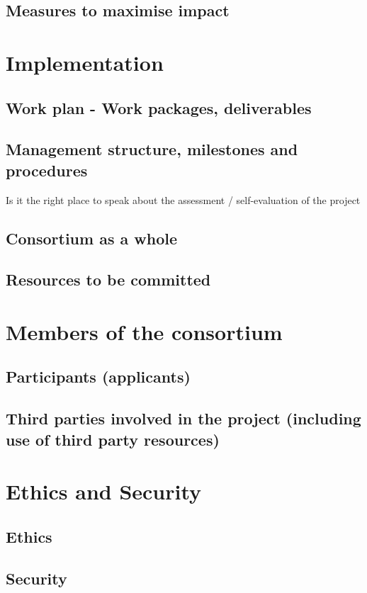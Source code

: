 \documentclass[12pt]{book}
\begin{document}
\section{Measures to maximise impact}



\chapter{Implementation}

\section{Work plan - Work packages, deliverables}



\section{Management structure, milestones and procedures}

{\color{red} Is it the right place to speak about the assessment /
  self-evaluation of the project}


 
\section{Consortium as a whole}

\section{Resources to be committed}

\chapter{Members of the consortium}

\section{Participants (applicants)}



\section{Third parties involved in the project (including use of third party resources)}


\chapter{Ethics and Security}

\section{Ethics}

\section{Security}








\end{document}
